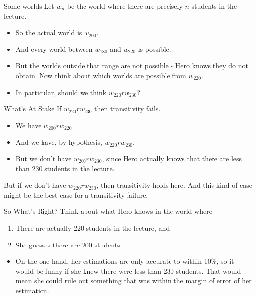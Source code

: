 \documentclass[
  14pt,
  letterpaper,
  ignorenonframetext,
]{beamer}
\providecommand{\tightlist}{%
  \setlength{\itemsep}{0pt}\setlength{\parskip}{0pt}}\usepackage{longtable,booktabs,array}
\begin{document}
\begin{frame}{Some worlds}
\protect\hypertarget{some-worlds}{}
Let \(w_n\) be the world where there are precisely \(n\) students in the
lecture.

\begin{itemize}
\tightlist
\item
  So the actual world is \(w_{200}\).
\item
  And every world between \(w_{180}\) and \(w_{220}\) is possible.
  \pause 
\item
  But the worlds outside that range are not possible - Hero knows they
  do not obtain. \pause Now think about which worlds are possible from
  \(w_{220}\). \pause 
\item
  In particular, should we think \(w_{220}rw_{230}\)?
\end{itemize}
\end{frame}

\begin{frame}{What's At Stake}
\protect\hypertarget{whats-at-stake}{}
If \(w_{220}rw_{230}\) then transitivity fails.

\begin{itemize}
\tightlist
\item
  We have \(w_{200}rw_{220}\).
\item
  And we have, by hypothesis, \(w_{220}rw_{230}\).
\item
  But we don't have \(w_{200}rw_{230}\), since Hero actually knows that
  there are less than 230 students in the lecture. \pause 
\end{itemize}

But if we don't have \(w_{220}rw_{230}\), then transitivity holds here.
And this kind of case might be the best case for a transitivity failure.
\end{frame}

\begin{frame}{So What's Right?}
\protect\hypertarget{so-whats-right}{}
Think about what Hero knows in the world where

\begin{enumerate}
\tightlist
\item
  There are actually 220 students in the lecture, and
\item
  She guesses there are 200 students. \pause 
\end{enumerate}

\begin{itemize}
\tightlist
\item
  On the one hand, her estimations are only accurate to within 10\%, so
  it would be funny if she knew there were less than 230 students. That
  would mean she could rule out something that was within the margin of
  error of her estimation.
\end{itemize}
\end{frame}
\end{document}
